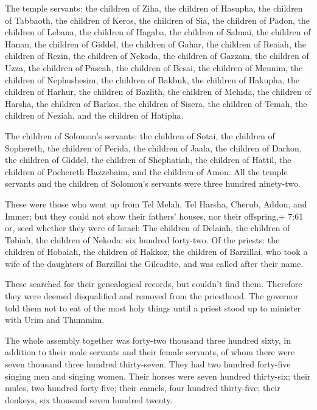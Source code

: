  The temple servants: the children of Ziha, the children of
Hasupha, the children of Tabbaoth,  the children of Keros,
the children of Sia, the children of Padon,  the children
of Lebana, the children of Hagaba, the children of Salmai, 
the children of Hanan, the children of Giddel, the children of Gahar,
 the children of Reaiah, the children of Rezin, the
children of Nekoda,  the children of Gazzam, the children
of Uzza, the children of Paseah,  the children of Besai,
the children of Meunim, the children of Nephushesim,  the
children of Bakbuk, the children of Hakupha, the children of Harhur,
 the children of Bazlith, the children of Mehida, the
children of Harsha,  the children of Barkos, the children
of Sisera, the children of Temah,  the children of Neziah,
and the children of Hatipha.

 The children of Solomon's servants: the children of Sotai,
the children of Sophereth, the children of Perida,  the
children of Jaala, the children of Darkon, the children of Giddel,
 the children of Shephatiah, the children of Hattil, the
children of Pochereth Hazzebaim, and the children of Amon. 
All the temple servants and the children of Solomon's servants were
three hundred ninety-two.

 These were those who went up from Tel Melah, Tel Harsha,
Cherub, Addon, and Immer; but they could not show their fathers' houses,
nor their offspring,+ 7:61 or, seed whether they were of Israel:
 The children of Delaiah, the children of Tobiah, the
children of Nekoda: six hundred forty-two.  Of the priests:
the children of Hobaiah, the children of Hakkoz, the children of
Barzillai, who took a wife of the daughters of Barzillai the Gileadite,
and was called after their name.

 These searched for their genealogical records, but
couldn't find them. Therefore they were deemed disqualified and removed
from the priesthood.  The governor told them not to eat of
the most holy things until a priest stood up to minister with Urim and
Thummim.

 The whole assembly together was forty-two thousand three
hundred sixty,  in addition to their male servants and
their female servants, of whom there were seven thousand three hundred
thirty-seven. They had two hundred forty-five singing men and singing
women.  Their horses were seven hundred thirty-six; their
mules, two hundred forty-five;  their camels, four hundred
thirty-five; their donkeys, six thousand seven hundred twenty.

